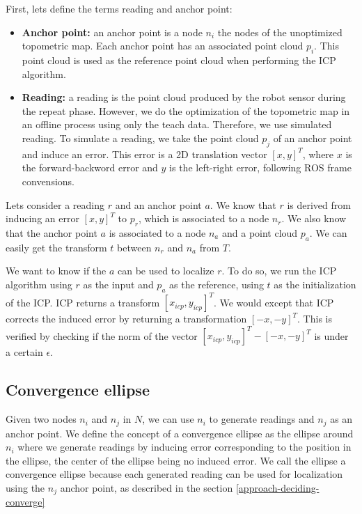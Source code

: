 \documentclass[letterpaper,10 pt,conference]{ieeeconf}
\begin{document}
First, lets define the terms reading and anchor point:

\begin{itemize}
  \item \textbf{Anchor point:} an anchor point is a node $n_i$ the nodes of the unoptimized topometric map. Each
    anchor point has an associated point cloud $p_i$. This point cloud is used as the reference point cloud when performing the
    ICP algorithm.
  \item \textbf{Reading:} a reading is the point cloud produced by the robot sensor during the repeat phase. However,
    we do the optimization of the topometric map in an offline process using only the teach data. Therefore,
    we use simulated reading. To simulate a reading, we take the point cloud $p_j$ of an anchor point and induce an
    error. This error is a 2D translation vector $[x, y]^T$, where $x$ is the forward-backword error and $y$ is the left-right error,
    following ROS frame convensions.
\end{itemize}

Lets consider a reading $r$ and an anchor point $a$. We know that $r$ is derived from inducing an error $[x, y]^T$ to $p_r$, which is associated to a node $n_r$.
We also know that the anchor point $a$ is associated to a node $n_a$ and a point cloud $p_a$. We can easily get the transform $t$ between $n_r$ and $n_a$ from $T$.


We want to know if the $a$ can be used to localize $r$. To do so, we run the ICP algorithm using $r$ as the input and $p_a$ as the reference, using $t$
as the initialization of the ICP. ICP returns a transform $[x_{icp}, y_{icp}]^T$. We would except that ICP corrects the induced error by returning
a transformation $[-x, -y]^T$. This is verified by checking if the norm of the vector $[x_{icp}, y_{icp}]^T - [-x, -y]^T$ is under a certain $\epsilon$.


\subsection{Convergence ellipse}
Given two nodes $n_i$ and $n_j$ in $N$, we can use $n_i$ to generate readings and $n_j$ as an anchor point.
We define the concept of a convergence ellipse as the ellipse around $n_i$ where we generate readings by inducing
error corresponding to the position in the ellipse, the center of the ellipse being no induced error. We call the ellipse
a convergence ellipse because each generated reading can be used for localization using the $n_j$ anchor point, as described in the
section \ref{approach-deciding-converge}
\end{document}

